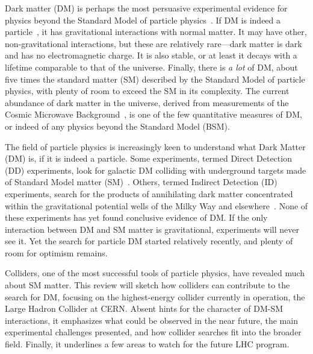 



Dark matter (DM) is perhaps the most persuasive experimental evidence for physics beyond the Standard Model of particle physics~\cite{Bertone:2016nfn}. 
If DM is indeed a particle~\cite{Steigman:1979kw}, it has gravitational interactions with normal matter.
It may have other, non-gravitational interactions, but these are relatively rare---dark matter is dark and has no electromagnetic charge.
It is also stable, or at least it decays with a lifetime comparable to that of the universe.
Finally, there is {\it a lot} of DM, about five times the standard matter (SM) described by the Standard Model of particle physics, with plenty of room to exceed the SM in its complexity.
The current abundance of dark matter in the universe, derived from measurements of the Cosmic Microwave Background~\cite{Ade:2015xua}, is one of the few quantitative measures of DM, or indeed of any physics beyond the Standard Model (BSM).

The field of particle physics is increasingly keen to understand what Dark Matter (DM) is, if it is indeed a particle. 
Some experiments, termed Direct Detection (DD) experiments, look for galactic DM colliding with underground targets made of Standard Model matter (SM)~\cite{0954-3899-43-1-013001}.
Others, termed Indirect Detection (ID) experiments, search for the products of annihilating dark matter concentrated within the gravitational potential wells of the Milky Way and elsewhere~\cite{Gaskins:2016cha}.
None of these experiments has yet found conclusive evidence of DM.
If the only interaction between DM and SM matter is gravitational, experiments will never see it.
Yet the search for particle DM started relatively recently, and plenty of room for optimism remains.

Colliders, one of the most successful tools of particle physics, have revealed much about SM matter.
This review will sketch how colliders can contribute to the search for DM, focusing on the highest-energy collider currently in operation, the Large Hadron Collider at CERN.
Absent hints for the character of DM-SM interactions, it emphasizes what could be observed in the near future, the main experimental challenges presented, and how collider searches fit into the broader field.
Finally, it underlines a few areas to watch for the future LHC program.

